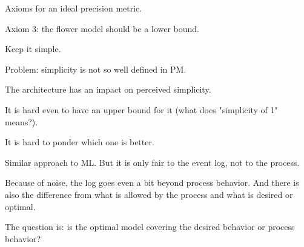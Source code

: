 \nextslides[slide=,until=107,highlight=107]

Axioms for an ideal precision metric.

Axiom 3: the flower model should be a lower bound.

\nextslides[slide=116,until=,highlight=]

Keep it simple.

\nextslides[slide=,until=118,highlight=118]

Problem: simplicity is not so well defined in PM.

The architecture has an impact on perceived simplicity.

\nextslides

It is hard even to have an upper bound for it (what does "simplicity of 1" means?).

\nextslides

\nextslides[slide=,until=122,highlight=122]

It is hard to ponder which one is better.

\nextslides

\nextslides[slide=125,until=126,highlight=126]

\nextslides[slide=,until=128,highlight=128]

\nextslides

Similar approach to ML. But it is only fair to the event log, not to the process.

\nextslides[slide=131,until=132,highlight=132]

Because of noise, the log goes even a bit beyond process behavior. And there is also the difference from what is allowed by the process and what is desired or optimal.

The question is: is the optimal model covering the desired behavior or process behavior?
